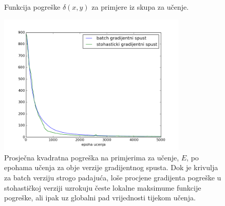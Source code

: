 \documentclass[paper=a4, fontsize=11pt]{scrartcl} %
\numberwithin{equation}{section} %
\numberwithin{figure}{section} %
\numberwithin{table}{section} %
\begin{document}
\begin{figure}[h]
\begin{subfigure}[b]{0.5\textwidth}
\end{subfigure}
\caption{Funkcija pogreške $\delta(x, y)$ za primjere iz skupa za učenje. }
\end{figure} 

\begin{figure}[h]
\centering
\includegraphics[width=0.8\textwidth]{figure_zad7.png}
\caption{Prosječna kvadratna pogreška na primjerima za učenje, $E$, po epohama učenja za obje verzije gradijentnog spusta. Dok je krivulja za batch verziju strogo padajuća, loše procjene gradijenta pogreške u stohastičkoj verziji uzrokuju česte lokalne maksimume funkcije pogreške, ali ipak uz globalni pad vrijednosti tijekom učenja.}
\end{figure}
\end{document}
